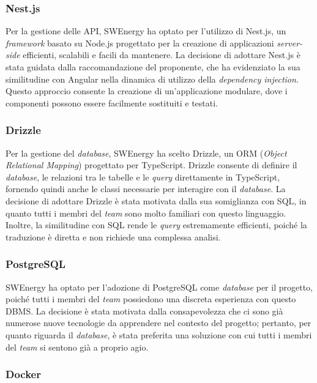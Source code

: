 \subsubsection{Nest.js}

Per la gestione delle API, SWEnergy ha optato per l'utilizzo di Nest.js, un
\textit{framework} basato su Node.js progettato per la creazione di applicazioni
\textit{server-side} efficienti, scalabili e facili da mantenere. La decisione di
adottare Nest.js è stata guidata dalla raccomandazione del proponente, che ha
evidenziato la sua similitudine con Angular nella dinamica di utilizzo della
\textit{dependency injection}. Questo approccio consente la creazione di
un'applicazione modulare, dove i componenti possono essere facilmente sostituiti
e testati.

\subsubsection{Drizzle}

Per la gestione del \textit{database}, SWEnergy ha scelto Drizzle, un ORM (\textit{Object
	Relational Mapping}) progettato per TypeScript. Drizzle consente di definire
il \textit{database}, le relazioni tra le tabelle e le \textit{query} direttamente in
TypeScript, fornendo quindi anche le classi necessarie per interagire con il
\textit{database}. La decisione di adottare Drizzle è stata motivata dalla sua
somiglianza con SQL, in quanto tutti i membri del \textit{team} sono molto familiari
con questo linguaggio. Inoltre, la similitudine con SQL rende le
\textit{query} estremamente efficienti, poiché la traduzione è diretta e non
richiede una complessa analisi.

\subsubsection{PostgreSQL}

SWEnergy ha optato per l'adozione di PostgreSQL come \textit{database} per il progetto,
poiché tutti i membri del \textit{team} possiedono una discreta esperienza con questo
DBMS. La decisione è stata motivata dalla consapevolezza che ci sono già
numerose nuove tecnologie da apprendere nel contesto del progetto; pertanto, per
quanto riguarda il \textit{database}, è stata preferita una soluzione con cui tutti i
membri del \textit{team} si sentono già a proprio agio.

\subsubsection{Docker}

